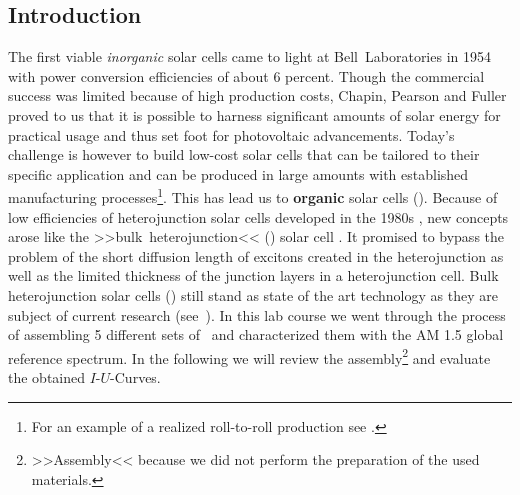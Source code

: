 \documentclass[a4paper,10pt,twocolumn]{article}
\begin{document}
\begin{extract*}
	
\section*{Introduction}%

The first viable \textit{inorganic} solar cells came to light at Bell~Laboratories in 1954 \cite{siliconSC_1}\cite{siliconSC_2} with power conversion efficiencies of about 6 percent. Though the commercial success was limited because of high production costs, Chapin, Pearson and Fuller proved to us that it is possible to harness significant amounts of solar energy for practical usage and thus set foot for photovoltaic advancements.\mypar
Today's challenge is however to build low-cost solar cells that can be tailored to their specific application and can be produced in large amounts with established manufacturing processes\footnote{For an example of a realized roll-to-roll production see \cite{rolltoroll}.}. This has lead us to \textbf{organic} solar cells (\OSC).\mypar
Because of low efficiencies of heterojunction solar cells developed in the 1980s \cite{tang}, new concepts arose like the >>bulk~heterojunction<< (\BHJ) solar cell \cite{heterojunk}. It promised to bypass the problem of the short diffusion length of excitons created in the heterojunction as well as the limited thickness of the junction layers in a heterojunction cell.\mypar
Bulk heterojunction solar cells (\BHSC) still stand as state of the art technology as they are subject of current research (see~\cite{modernbulkhetero}). In this lab course we went through the process of assembling 5 different sets of \BHSC\ and characterized them with the {\os\sefo AM 1.5} global reference spectrum. In the following we will review the assembly\footnote{>>Assembly<< because we did not perform the preparation of the used materials.} and evaluate the obtained $I$-$U$-Curves. 


\end{extract*}
\end{document}
